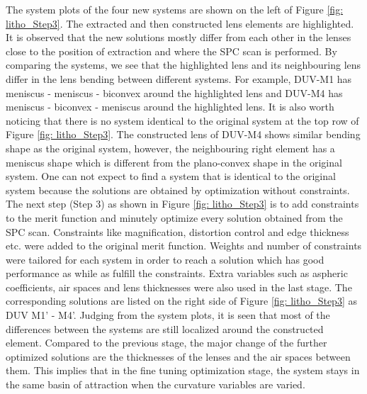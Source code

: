 The system plots of the four new systems are shown on the left of Figure \ref{fig: litho_Step3}. The extracted and then constructed lens elements are highlighted. It is observed that the new solutions mostly differ from each other in the lenses close to the position of extraction and where the SPC scan is performed. By comparing the systems, we see that the highlighted lens and its neighbouring lens differ in the lens bending between different systems. For example, DUV-M1 has meniscus - meniscus - biconvex around the highlighted lens and DUV-M4 has meniscus - biconvex - meniscus around the highlighted lens. It is also worth noticing that there is no system identical to the original system at the top row of Figure \ref{fig: litho_Step3}. The constructed lens of DUV-M4 shows similar bending shape as the original system, however, the neighbouring right element has a meniscus shape which is different from the plano-convex shape in the original system. One can not expect to find a system that is identical to the original system because the solutions are obtained by optimization without constraints. The next step (Step 3) as shown in Figure \ref{fig: litho_Step3} is to add constraints to the merit function and minutely optimize every solution obtained from the SPC scan. Constraints like magnification, distortion control and edge thickness etc. were added to the original merit function. Weights and number of constraints were tailored for each system in order to reach a solution which has good performance as while as fulfill the constraints. Extra variables such as aspheric coefficients, air spaces and lens thicknesses were also used in the last stage. The corresponding solutions are listed on the right side of Figure \ref{fig: litho_Step3} as DUV M1' - M4'. Judging from the system plots, it is seen that most of the differences between the systems are still localized around the constructed element. Compared to the previous stage, the major change of the further optimized solutions are the thicknesses of the lenses and the air spaces between them. This implies that in the fine tuning optimization stage, the system stays in the same basin of attraction when the curvature variables are varied.


